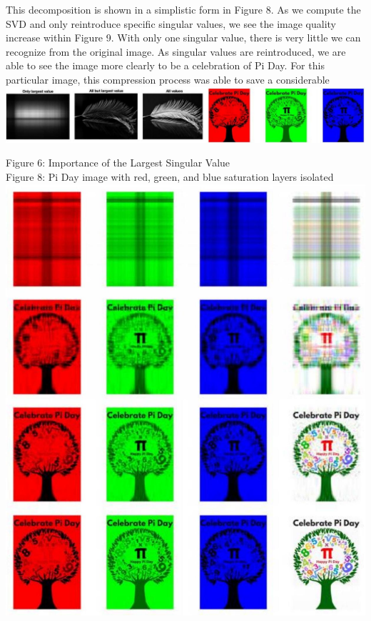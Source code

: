 \documentclass[10pt]{article}
\begin{document}
This decomposition is shown in a simplistic form in Figure 8. As we compute the SVD and only reintroduce specific singular values, we see the image quality increase within Figure 9. With only one singular value, there is very little we can recognize from the original image. As singular values are reintroduced, we are able to see the image more clearly to be a celebration of Pi Day. For this particular image, this compression process was able to save a considerable\\
\includegraphics[max width=\textwidth, center]{2025_04_09_7d70d965b908bc4c1892g-5(1)}

Figure 6: Importance of the Largest Singular Value\\
Figure 8: Pi Day image with red, green, and blue saturation layers isolated\\
\includegraphics[max width=\textwidth, center]{2025_04_09_7d70d965b908bc4c1892g-6(1)}
\end{document}

